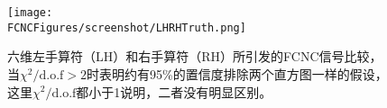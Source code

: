 \begin{figure}[H]
\centering
\texttt{[image: \\FCNCFigures/screenshot/LHRHTruth.png]}
\caption{六维左手算符（LH）和右手算符（RH）所引发的FCNC信号比较，当$\chi^2/\mathrm{d.o.f}>2$时表明约有95\%的置信度排除两个直方图一样的假设，这里$\chi^2/\mathrm{d.o.f}$都小于1说明，二者没有明显区别。}
\label{fig:LHRHTruth}
\end{figure}